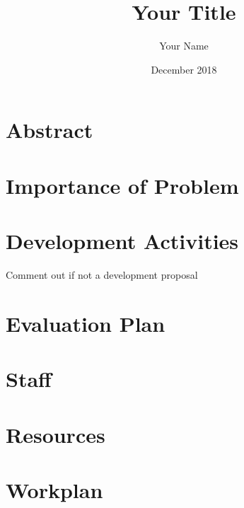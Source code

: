 \documentclass[12pt,letterpaper]{article}
\title{Your Title}
\author{Your Name}
\date{December 2018}
\begin{document}
\maketitle
\thispagestyle{empty}

\tableofcontents
\clearpage
\section*{Abstract}
{

\normalsize

}

\clearpage
{} 

%
%
\section{Importance of Problem}

\section{Development Activities}
Comment out if not a development proposal

%
\section{Evaluation Plan}

\section{Staff}

\section{Resources}

\section{Workplan}

\end{document}
